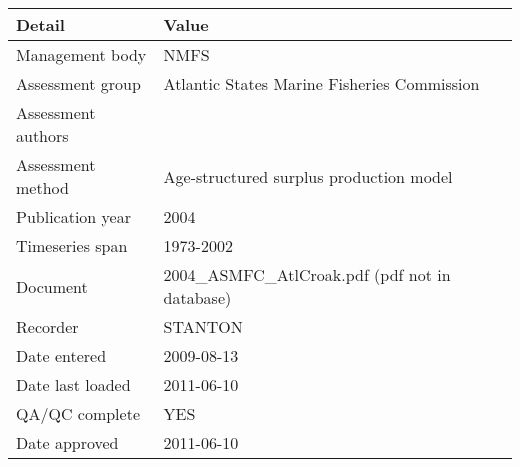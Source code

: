 \begin{table}[htb]
\centering
\begin{tabular}{lp{7cm}}
\toprule
Detail & Value \\
\midrule
Management body    & NMFS                                            \\
Assessment group   & Atlantic States Marine Fisheries Commission     \\
Assessment authors &                                                 \\
Assessment method  & Age-structured surplus production model         \\
Publication year   & 2004                                            \\
Timeseries span    & 1973-2002                                       \\
Document           & 2004\_ASMFC\_AtlCroak.pdf (pdf not in database) \\
Recorder           & STANTON                                         \\
Date entered       & 2009-08-13                                      \\
Date last loaded   & 2011-06-10                                      \\
QA/QC complete     & YES                                             \\
Date approved      & 2011-06-10                                      \\
\bottomrule
\end{tabular}
\label{tab:assessdet}
\end{table}
